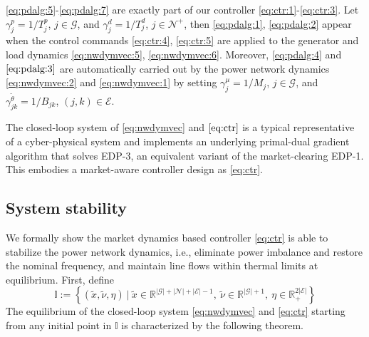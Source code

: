 \documentclass[journal,12pt,onecolumn,draftclsnofoot]{IEEEtran}
\begin{document}
\eqref{eq:pdalg:5}-\eqref{eq:pdalg:7} are exactly part of our controller \eqref{eq:ctr:1}-\eqref{eq:ctr:3}. Let $\gamma_j^p=1/T^{p}_j$, $j\in\mathcal{G}$, and $\gamma_j^d=1/T_j^d$, $j\in\mathcal{N}^+$, then \eqref{eq:pdalg:1}, \eqref{eq:pdalg:2} appear when the control commands \eqref{eq:ctr:4}, \eqref{eq:ctr:5} are applied to the generator and load dynamics \eqref{eq:nwdymvec:5}, \eqref{eq:nwdymvec:6}. Moreover, \eqref{eq:pdalg:4} and $\eqref{eq:pdalg:3}$ are automatically carried out by the power network dynamics \eqref{eq:nwdymvec:2} and \eqref{eq:nwdymvec:1} by setting $\gamma^\mu_j=1/M_j$, $j\in\mathcal{G}$, and $\gamma^{\tilde{\theta}}_{jk}=1/B_{jk}$, $(j,k)\in\mathcal{E}$.

The closed-loop system of \eqref{eq:nwdymvec} and $\eqref{eq:ctr}$ is a typical representative of a cyber-physical system and implements an underlying primal-dual gradient algorithm that solves EDP-3, an equivalent variant of the market-clearing EDP-1. This embodies a market-aware controller design as \eqref{eq:ctr}.  

\subsection{System stability}

We formally show the market dynamics based controller \eqref{eq:ctr} is able to stabilize the power network dynamics, i.e., eliminate power imbalance and restore the nominal frequency, and maintain line flows within thermal limits at equilibrium. First, define 
\begin{displaymath}
\mathbb{I}:=\left\{(\tilde{x},\tilde{\nu},\eta) \ | \ \tilde{x}\in\mathbb{R}^{|\mathcal{G}|+|\mathcal{N}|+|\mathcal{E}|-1},~\tilde{\nu}\in\mathbb{R}^{|\mathcal{G}|+1},~\eta\in\mathbb{R}_+^{2|\mathcal{E}|}\right\}
\end{displaymath}
The equilibrium of the closed-loop system \eqref{eq:nwdymvec} and \eqref{eq:ctr} starting from any initial point in $\mathbb{I}$ is characterized by the following theorem.
\end{document}
